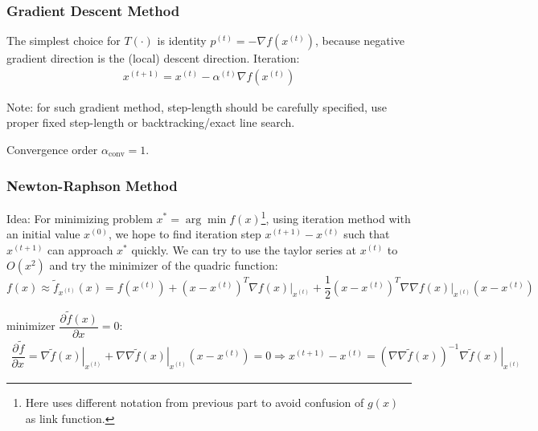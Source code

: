     

\subsubsection{Gradient Descent Method}
    \hypertarget{GradientDescent}{}The simplest choice for $ T(\cdot) $ is identity $ p^{(t)}=-\nabla f\left(x^{(t)}\right) $, because negative gradient direction is the (local) descent direction. Iteration:
    \begin{align}
        x^{(t+1)}=x^{(t)} -\alpha ^{(t)}\nabla f\left(x^{(t)}\right) 
    \end{align}
    
    Note: for such gradient method, step-length should be carefully specified, use proper fixed step-length or backtracking/exact line search.

    Convergence order $ \alpha_\mathrm{conv}  =1 $.

    
    
    
    


\subsubsection{Newton-Raphson Method}
\hypertarget{NRMethod}{}
    Idea: For minimizing problem $ x^*=\arg\min f(x) $\footnote{Here uses different notation from previous part to avoid confusion of $ g(x) $ as link function.}, using iteration method with an initial value $ x^{(0)} $, we hope to find iteration step $ x^{(t+1)}-x^{(t)} $ such that $ x^{(t+1)} $ can approach $ x^* $ quickly. We can try to use the taylor series at $ x^{(t)} $ to $ O(x^2) $ and try the minimizer of the quadric function:
    \begin{equation}\label{EqaGaussRaphsonQuadricExpansion}
        f(x)\approx \tilde{f}_{x^{(t)}}(x)=f(x^{(t)})+(x-x^{(t)})^T\nabla \left. f(x)\right|_{x^{(t)}}+\dfrac{1}{2}(x-x^{(t)})^T\nabla\nabla \left. f(x) \right|_{x^{(t)}} (x-x^{(t)})
    \end{equation}
    
    
    minimizer $ \dfrac{\partial^{} \tilde{f}(x)}{\partial x^{}}=0 $:
    \begin{align}
        \dfrac{\partial^{} \tilde{f}}{\partial x^{}}=\nabla \left.\tilde{f}(x)\right|_{x^{(t)}}+ \nabla\nabla \left.\tilde{f}(x)\right|_{x^{(t)}}(x-x^{(t)})=0\Rightarrow x^{(t+1)}-x^{(t)}= \left( \nabla\nabla \tilde{f}(x) \right)^{-1}\left.\nabla \tilde{f}(x) \right|_{x^{(t)}}
    \end{align}

